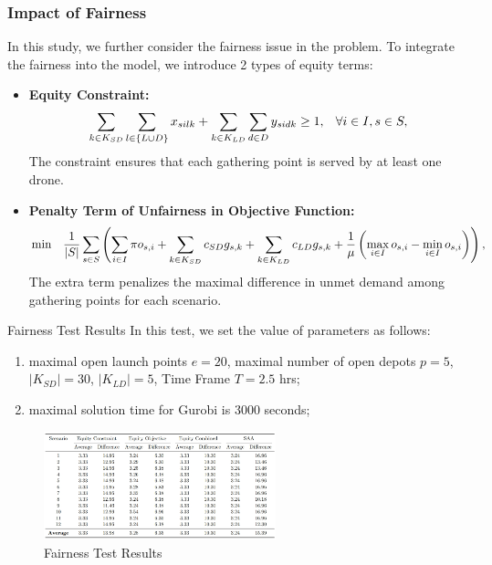\documentclass[aspectratio=169]{beamer}
\begin{document}
\begin{frame}\frametitle{Impact of Fairness}
In this study, we further consider the fairness issue in the problem. To integrate the fairness into the model, we introduce 2 types of equity terms:
\begin{itemize}
    \item \textbf{Equity Constraint:} \\    
    \begin{equation}
        \scriptsize
        \sum_{k \in K_{SD}} \sum_{l \in \{L \cup D\}} x_{silk} +  \sum_{k \in K_{LD}} \sum_{d \in D} y_{sidk}\geq 1, \quad \forall i \in I, s \in S,
        \label{eq:fairness_constraint}
    \end{equation}
    The constraint ensures that each gathering point is served by at least one drone.
    \item \textbf{Penalty Term of Unfairness in Objective Function:} \\
    \begin{equation}
    \scriptsize
        \min \quad \frac{1}{|S|} \sum_{s \in S} \left(\sum_{i \in I} \pi o_{s,i} + \sum_{k \in K_{SD}} c_{SD} g_{s,k} + \sum_{k \in K_{LD}} c_{LD} g_{s,k} + \frac{1}{\mu} \left( \max_{i \in I} o_{s,i} - \min_{i \in I} o_{s,i} \right) \right),
        \label{eq:fairness_objective}
    \end{equation}
    The extra term penalizes the maximal difference in unmet demand among gathering points for each scenario.
\end{itemize}
\end{frame}

\begin{frame}{Fairness Test Results}
In this test, we set the value of parameters as follows:
\begin{enumerate}[label=\arabic*.]
    \item maximal open launch points $e = 20$, maximal number of open depots $p = 5$, $|K_{SD}| = 30$, $|K_{LD}| = 5$, Time Frame $T=2.5$ hrs;
    \item maximal solution time for Gurobi is 3000 seconds;
\end{enumerate}
\begin{figure}
    \centering
    \includegraphics[width=0.6\textwidth]{fig_fairness_test.png}
    \caption{Fairness Test Results}
    \label{fig:fairness_test}
\end{figure}
\end{frame}
\end{document}
